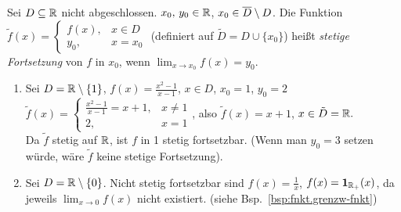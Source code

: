 \documentclass[12pt]{scrreprt}
\begin{document}
\begin{dfn}\label{dfn:fnkt.stetige-forts}
Sei $D\subseteq\mathbb{R}$ nicht abgeschlossen. $x_0,\,y_0\in\mathbb{R}$, $x_0\in\overline{D}\setminus D$. Die Funktion
$\tilde{f}(x) = \begin{cases}
f(x), &x\in D\\
y_0, & x = x_0
\end{cases}$ (definiert auf $\tilde{D} = D\cup\{x_0\}$) heißt \emph{stetige Fortsetzung} von $f$ in $x_0$, wenn $\lim_{x\to x_0} f(x) = y_0$.
\end{dfn}

\begin{bsp}\label{bsp:fnkt.stetige-forts}
\begin{enumerate}
\item Sei $D=\mathbb{R}\setminus\{1\}$, $f(x)=\frac{x^2-1}{x-1}$, $x\in D$, $x_0=1$, $y_0=2$\\
\folgt $\tilde{f}(x)=\begin{cases}
\frac{x^2-1}{x-1} = x+1, &x\ne 1\\
2, & x=1
\end{cases}$, also $\tilde{f}(x) = x+1$, $x\in\tilde{D}=\mathbb{R}.$\\
Da $\tilde{f}$ stetig auf $\mathbb{R}$, ist $f$ in 1 stetig fortsetzbar. (Wenn man $y_0=3$ setzen würde, wäre $\tilde{f}$ keine
stetige Fortsetzung).\label{bsp:fnkt.stetige-forts.a}
\item Sei $D=\mathbb{R}\setminus\{0\}$. Nicht stetig fortsetzbar sind $f(x)=\frac{1}{x}$, $f(x)=\mathbf{1}_{\mathbb{R}_+}(x)$, 
da jeweils $\lim_{x\to 0}f(x)$ nicht existiert. (siehe Bsp.~\ref{bsp:fnkt.grenzw-fnkt})\label{bsp:fnkt.stetige-forts.b}
\end{enumerate}
\end{bsp}
\end{document}
